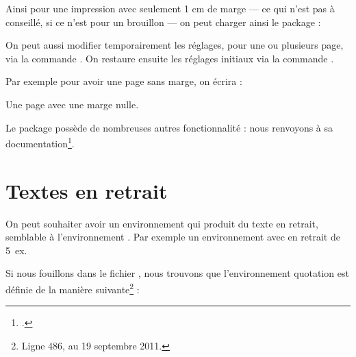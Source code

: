 Ainsi pour une impression avec seulement 1 cm de marge --- ce qui n'est pas à conseillé, si ce n'est pour un brouillon --- on peut charger ainsi le package :

\begin{latexcode}
\usepackage[lmargin=1cm,rmargin=1cm,tmargin=1cm,bmargin=1cm]{geometry}
\end{latexcode}

On peut aussi modifier temporairement les réglages, pour une ou plusieurs page, via la commande . On restaure ensuite les réglages initiaux  via la commande .

Par exemple pour avoir une page sans marge, on écrira :

\begin{latexcode}
Une page avec une marge nulle.
\newpage
\restoregeometry
\end{latexcode}

Le package  possède de nombreuses autres fonctionnalité : nous renvoyons à sa documentation\footcite{geometry}.

\section{Textes en retrait}

On peut souhaiter avoir un environnement qui produit du texte en retrait, semblable à l'environnement . Par exemple un environnement  avec en retrait de 5~ex.

Si nous fouillons dans le fichier , nous trouvons que l'environnement quotation est définie de la manière suivante\footnote{Ligne 486, au 19 septembre 2011.} :

\begin{latexcode}
\newenvironment{quotation}
               {\list{}{\listparindent 1.5em%
                        \itemindent    \listparindent
                        \rightmargin   \leftmargin
                        \parsep        \z@ \@plus\p@}%
                \item\relax}
               {\endlist}
\end{latexcode}

